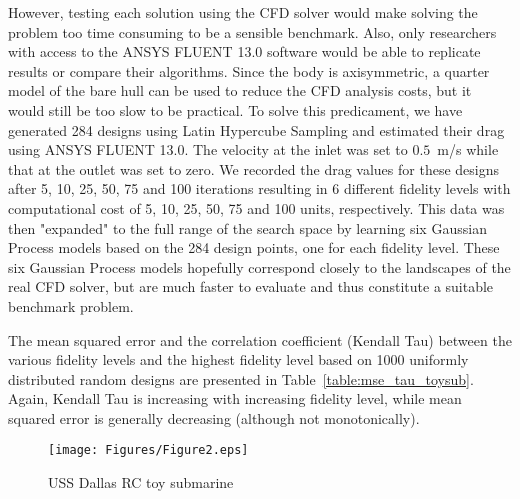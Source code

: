 However, testing each solution using the CFD solver would make solving the problem too time consuming to be a sensible benchmark. Also, only researchers with access to the ANSYS FLUENT 13.0 software would be able to replicate results or compare their algorithms. Since the body is axisymmetric, a quarter model of the bare hull can be used to reduce the CFD analysis costs, but it would still be too slow to be practical.
To solve this predicament, we have generated 284 designs using Latin Hypercube Sampling and estimated their drag using ANSYS FLUENT 13.0. The velocity at the inlet was set to $0.5$~m/s while that at the outlet was set to zero. We recorded the drag values for these designs after 5, 10, 25, 50, 75 and 100 iterations resulting in 6 different fidelity levels with computational cost of 5, 10, 25, 50, 75 and 100 units, respectively. 
This data was then "expanded" to the full range of the search space by learning six Gaussian Process models based on the 284 design points, one for each fidelity level. These six Gaussian Process models hopefully correspond closely to the landscapes of the real CFD solver, but are much faster to evaluate and thus constitute a suitable benchmark problem. 

The mean squared error and the correlation coefficient (Kendall Tau) between the various fidelity levels and the highest fidelity level based on 1000 uniformly distributed random designs are presented in Table~\ref{table:mse_tau_toysub}. Again, Kendall Tau is increasing with increasing fidelity level, while mean squared error is generally decreasing (although not monotonically). 

\begin{figure}[!htb]
	\begin{center}
		\texttt{[image: Figures/Figure2.eps]}
		\caption{USS Dallas RC toy submarine}
		\label{fig:dallas_photo}
	\end{center}       
\end{figure}

